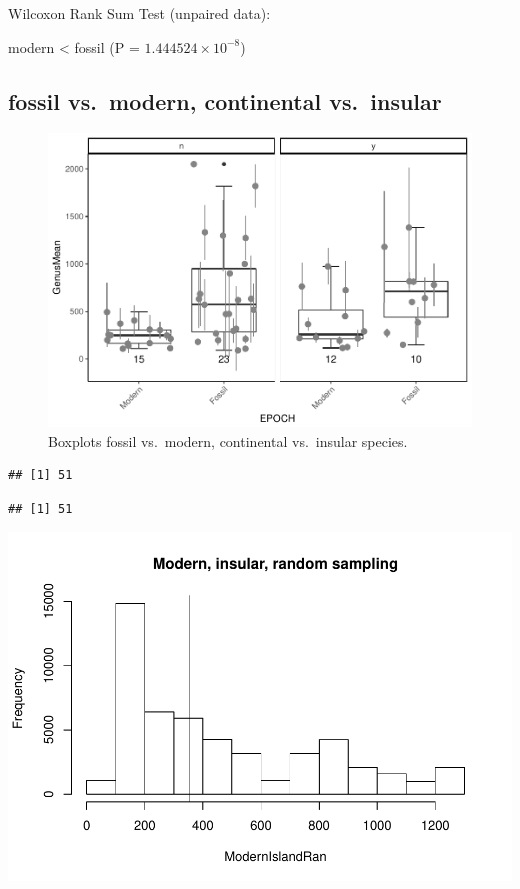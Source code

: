 \documentclass[]{article}
\begin{document}
Wilcoxon Rank Sum Test (unpaired data):

modern \textless{} fossil (P = \(1.444524\times 10^{-8}\))

\newpage

\subsection{fossil vs.~modern, continental
vs.~insular}\label{fossil-vs.modern-continental-vs.insular}

\begin{figure}[htbp]
\centering
\includegraphics{MA_JJ_files/figure-latex/BPFMCI-1.pdf}
\caption{Boxplots fossil vs.~modern, continental vs.~insular species.}
\end{figure}

\begin{verbatim}
## [1] 51
\end{verbatim}

\begin{verbatim}
## [1] 51
\end{verbatim}

\includegraphics{MA_JJ_files/figure-latex/RSMFCI-1.pdf}
\end{document}
